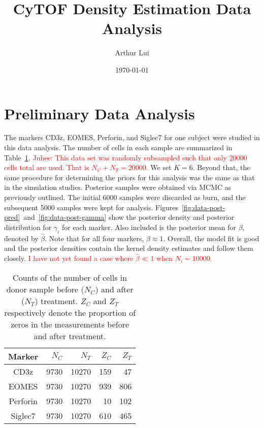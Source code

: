 \documentclass[12pt]{article} %
\title{CyTOF Density Estimation Data Analysis}
\author{Arthur Lui}
\date{\today} %
\newcommand{\alert}[1]{\textcolor{red}{#1}}
\begin{document}
\maketitle

\section{Preliminary Data Analysis}
The markers CD3z, EOMES, Perforin, and Siglec7 for one subject were studied
in this data analysis. The number of cells in each sample are summarized in 
Table~\ref{tab:data-counts}.
%
\alert{Juhee: This data set was randomly subsampled such that only 20000
cells total are used. That is $N_C + N_T = 20000$.}
%
We set $K=6$. Beyond that, the same procedure for determining the priors for
this analysis was the same as that in the simulation studies. Posterior
samples were obtained via MCMC as previously outlined. The initial 6000
samples were discarded as burn, and the subsequent 5000 samples were kept for
analysis. Figures~\ref{fig:data-post-pred}~and~\ref{fig:data-post-gamma} show
the posterior density and posterior distribution for $\gamma_i$ for each
marker. Also included is the posterior mean for $\beta$, denoted by
$\hat\beta$. Note that for all four markers, $\hat\beta\approx 1$. Overall,
the model fit is good and the posterior densities contain the kernel density
estimates and follow them closely. \alert{I have not yet found a case where 
$\hat\beta \ll 1$ when $N_i=10000$.}

\begin{table}[!t]
  \centering
  \begin{tabular}{|c|rrrr|}
    \hline
    Marker   & $N_C$ & $N_T$ & $Z_C$ & $Z_T$ \\ 
    \hline
    CD3z       & 9730 & 10270 & 159 &  47 \\ 
    EOMES      & 9730 & 10270 & 939 & 806 \\ 
    Perforin   & 9730 & 10270 &  10 & 102 \\ 
    Siglec7    & 9730 & 10270 & 610 & 465 \\ 
    \hline
  \end{tabular} 
  \caption{Counts of the number of cells in donor sample before ($N_C$) and
  after ($N_T$) treatment. $Z_C$ and $Z_T$ respectively denote the proportion
  of zeros in the measurements before and after treatment.}
  \label{tab:data-counts}
\end{table}
\end{document}
